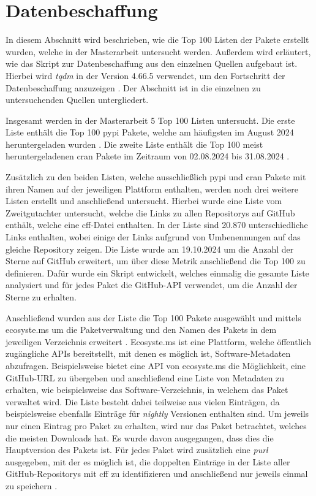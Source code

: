 \section{Datenbeschaffung}
\label{sec:datenbeschaffung}
In diesem Abschnitt wird beschrieben, wie die Top 100 Listen der Pakete erstellt wurden, welche in der Masterarbeit untersucht werden.
Außerdem wird erläutert, wie das Skript zur Datenbeschaffung aus den einzelnen Quellen aufgebaut ist.
Hierbei wird \emph{tqdm} in der Version 4.66.5 verwendet, um den Fortschritt der Datenbeschaffung anzuzeigen \autocite{costa-luis_tqdm_2024}.
Der Abschnitt ist in die einzelnen zu untersuchenden Quellen untergliedert.

Insgesamt werden in der Masterarbeit 5 Top 100 Listen untersucht.
Die erste Liste enthält die Top 100 \gls{pypi} Pakete, welche am häufigsten im August 2024 heruntergeladen wurden \autocite{kemenade_top-pypi-packages_2024}.
Die zweite Liste enthält die Top 100 meist heruntergeladenen \gls{cran} Pakete im Zeitraum von 02.08.2024 bis 31.08.2024 \autocite{csardi_cranlogsapp_2024}.

Zusätzlich zu den beiden Listen, welche ausschließlich \gls{pypi} und \gls{cran} Pakete mit ihren Namen auf der jeweiligen Plattform enthalten, werden noch drei weitere Listen erstellt und anschließend untersucht.
Hierbei wurde eine Liste vom Zweitgutachter untersucht, welche die Links zu allen Repositorys auf GitHub enthält, welche eine \gls{cff}-Datei enthalten.
In der Liste sind 20.870 unterschiedliche Links enthalten, wobei einige der Links aufgrund von Umbenennungen auf das gleiche Repository zeigen.
Die Liste wurde am 19.10.2024 um die Anzahl der Sterne auf GitHub erweitert, um über diese Metrik anschließend die Top 100 zu definieren.
Dafür wurde ein Skript entwickelt, welches einmalig die gesamte Liste analysiert und für jedes Paket die GitHub-API verwendet, um die Anzahl der Sterne zu erhalten.

Anschließend wurden aus der Liste die Top 100 Pakete ausgewählt und mittels ecosyste.ms um die Paketverwaltung und den Namen des Pakets in dem jeweiligen Verzeichnis erweitert \autocite{nesbitt_ecosystems_2024}.
Ecosyste.ms ist eine Plattform, welche öffentlich zugängliche APIs bereitstellt, mit denen es möglich ist, Software-Metadaten abzufragen.
Beispielsweise bietet eine API von ecosyste.ms die Möglichkeit, eine GitHub-URL zu übergeben und anschließend eine Liste von Metadaten zu erhalten, wie beispielsweise das Software-Verzeichnis, in welchem das Paket verwaltet wird.
Die Liste besteht dabei teilweise aus vielen Einträgen, da beispielsweise ebenfalls Einträge für \emph{nightly} Versionen enthalten sind.
Um jeweils nur einen Eintrag pro Paket zu erhalten, wird nur das Paket betrachtet, welches die meisten Downloads hat.
Es wurde davon ausgegangen, dass dies die Hauptversion des Pakets ist.
Für jedes Paket wird zusätzlich eine \emph{purl} ausgegeben, mit der es möglich ist, die doppelten Einträge in der Liste aller GitHub-Repositorys mit \gls{cff} zu identifizieren und anschließend nur jeweils einmal zu speichern \autocites{ombredanne_purl-spec_2024}{nesbitt_ecosystems_2024}.

